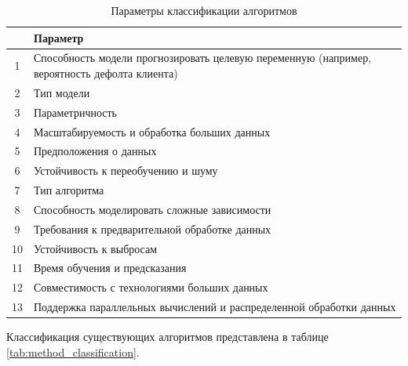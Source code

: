 \begin{table}[ht]
  \centering
  \caption{Параметры классификации алгоритмов}
  \label{tab:type_classification}
  \begin{tabular}{|c|p{}|}
    \hline
    \textbf{} & \textbf{Параметр}                                                                            \\
    \hline
    1         & Способность модели прогнозировать целевую переменную (например, вероятность дефолта клиента) \\
    2         & Тип модели                                                                                   \\
    3         & Параметричность                                                                              \\
    4         & Масштабируемость и обработка больших данных                                                  \\
    5         & Предположения о данных                                                                       \\
    6         & Устойчивость к переобучению и шуму                                                           \\
    7         & Тип алгоритма                                                                                \\
    8         & Способность моделировать сложные зависимости                                                 \\
    9         & Требования к предварительной обработке данных                                                \\
    10        & Устойчивость к выбросам                                                                      \\
    11        & Время обучения и предсказания                                                                \\
    12        & Совместимость с технологиями больших данных                                                  \\
    13        & Поддержка параллельных вычислений и распределенной обработки данных                          \\
    \hline
  \end{tabular}
\end{table}

\newpage
Классификация существующих алгоритмов представлена в таблице \ref{tab:method_classification}.

